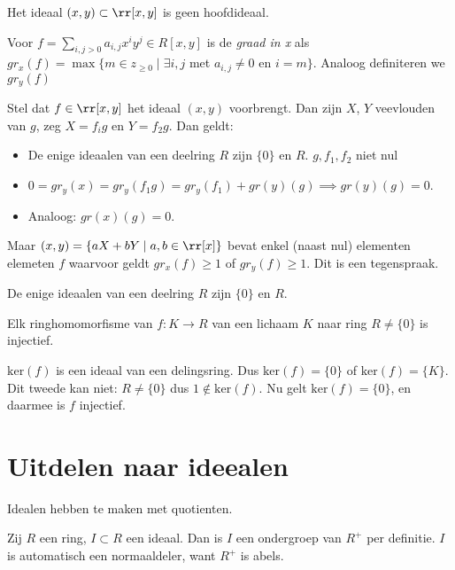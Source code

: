 \documentclass[a4paper,12pt,oneside]{book}
\begin{document}
\begin{voorbeeld}
Het ideaal $(x,y) \subset \rr[x,y]$ is geen hoofdideaal.
\end{voorbeeld}

\begin{definitie}
Voor $f = \sum_{i,j > 0} a_{i,j}x^iy^j \in R[x,y]$ is de \textit{graad in x} als $gr_x(f) = \max\{m \in z_{\ge 0} \mid \exists i,j $ met $ a_{i,j} \ne 0 $ en $i = m\}$. Analoog definiteren we $gr_y(f)$
\end{definitie}
\begin{bewijs}
Stel dat $f\in \rr[x,y]$ het ideaal $(x,y)$ voorbrengt. Dan zijn $X$, $Y$ veevlouden van $g$, zeg $X = f_i g$ en $Y = f_2 g$. Dan geldt:
\begin{itemize}
\item  De enige ideaalen van een deelring $R$ zijn $\{0\}$ en $R$.
$g, f_1, f_2$ niet nul
\item $0 = gr_y(x) = gr_y(f_1g) = gr_y(f_1) + gr(y)(g) \implies gr(y)(g) = 0$.
\item Analoog: $gr(x)(g) = 0$.
\end{itemize}
Maar $(x,y) = \{aX + bY \mid a,b \in \rr[x]\}$ bevat enkel (naast nul) elementen elemeten $f$ waarvoor geldt $gr_x(f) \ge 1$ of $gr_y(f) \ge 1$. Dit is een tegenspraak.
\end{bewijs}

\begin{gevolg}
De enige ideaalen van een deelring $R$ zijn $\{0\}$ en $R$.
\end{gevolg}

\begin{gevolg}
Elk ringhomomorfisme van $f: K \to R$ van een lichaam $K$ naar ring $R \ne \{0\}$ is injectief.
\end{gevolg}

\begin{bewijs}
$\mathrm{ker}(f)$ is een ideaal van een delingsring. Dus $\mathrm{ker}(f) = \{0\}$  of  $\mathrm{ker}(f) = \{K\}$. Dit tweede kan niet: $R \ne \{0\}$ dus $1 \not \in \mathrm{ker}(f)$. Nu gelt  $\mathrm{ker}(f) = \{0\}$, en daarmee is $f$ injectief.
\end{bewijs}

\section{Uitdelen naar ideealen}
Idealen hebben te maken met quotienten.

Zij $R$ een ring, $I \subset R$ een ideaal. Dan is $I$ een ondergroep van $R^+$ per definitie. $I$ is automatisch een normaaldeler, want $R^+$ is abels.
\end{document}
